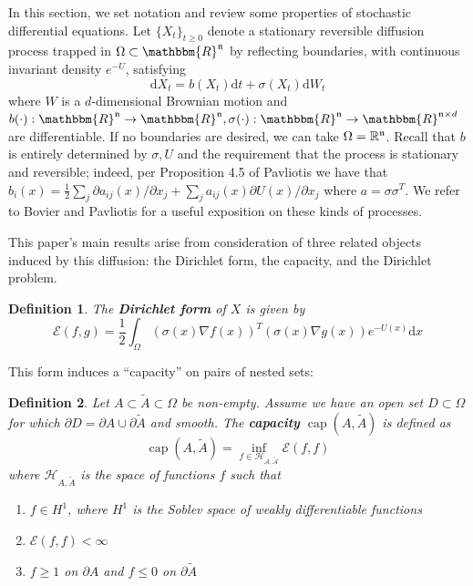 \documentclass[english, aip, jcp, priprint, graphicx,floatfix]{revtex4-1}
\newtheorem{definition}{Definition}
\theoremstyle{plain}
\theoremstyle{definition}
\theoremstyle{plain}
\begin{document}
In this section, we set notation and review some properties of stochastic differential equations.   Let $\{X_t\}_{t \geqslant 0}$ denote a stationary reversible diffusion process trapped in 
$\Omega \subset \mathbbm{R}^\dimension$ by reflecting boundaries, with continuous invariant density $e^{-U}$, satisfying 
%
\[ \mathrm{d} X_t = b (X_t) \mathrm{d} t + \sigma (X_t) \mathrm{d} W_t \]
%
where $W$ is a $d$-dimensional Brownian motion and $b (\cdot) : \mathbbm{R}^\dimension \rightarrow \mathbbm{R}^\dimension,\sigma
(\cdot) : \mathbbm{R}^\dimension \rightarrow \mathbbm{R}^{\dimension \times d}$ are differentiable.  If no boundaries are desired, we can take $\Omega= \mathbb{R}^{\mathfrak{n}}$.  Recall that $b$ is entirely determined by $\sigma,U$ and the requirement that the process is stationary and reversible; indeed, per Proposition 4.5 of Pavliotis\cite{Pavliotis2016-xn} we have that $b_i(x)=\frac{1}{2} \sum_j \partial a_{ij}(x)/\partial x_j + \sum_j a_{ij}(x) \partial U(x)/\partial x_j$ where $a=\sigma\sigma^T$.  We refer to Bovier\cite{Bovier2016-ez} and Pavliotis\cite{Pavliotis2016-xn} for a useful exposition on these kinds of processes.

This paper's main results arise from consideration of three related objects induced by this diffusion: the Dirichlet form, the capacity, and the Dirichlet problem.  

\begin{definition}
The \textbf{Dirichlet form} of $X$ is given
by
\[ \mathcal{E} (f, g) = \frac{1}{2} \int_\Omega (\sigma(x) \nabla f (x))^T 
 (\sigma(x) \nabla g (x)) e^{- U (x)} \mathrm{d} x \]
\end{definition}

This form induces a ``capacity'' on pairs of nested sets:

\begin{definition}
Let $A \subset \tilde{A} \subset \Omega$ be non-empty. Assume we have an
open set $D \subset \Omega$ for which $\partial D = \partial A \cup \partial
\tilde{A}$ and smooth. The \textbf{capacity} $\ensuremath{\operatorname{cap}} (A, \tilde{A})$ is defined as
%
\[ \ensuremath{\operatorname{cap}} (A, \tilde{A}) = \inf_{f \in
\mathcal{H_{A, \tilde{A}}}} \mathcal{E} (f, f) \]
%
where $\mathcal{H}_{A, \tilde{A}}$ is the space of functions $f$ such that
\begin{enumerate}
\item $f \in H^1$, where $H^1$ is the Soblev space of weakly
differentiable functions

\item $\mathcal{E} (f, f) < \infty$

\item $f \geqslant 1$ on $\partial A$ and $f \leqslant 0$ on $\partial
\tilde{A}$
\end{enumerate}

\end{definition}
\end{document}

